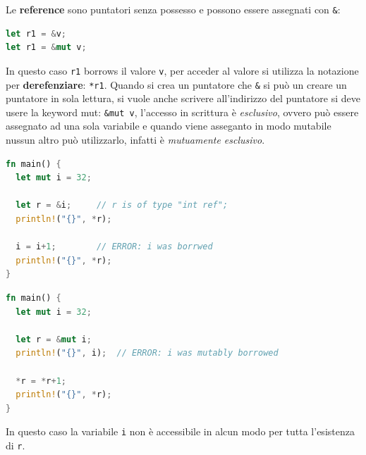\documentclass[12pt]{article}
\begin{document}
Le \textbf{reference} sono puntatori senza possesso e possono essere assegnati con \texttt{\&}:
\begin{lstlisting}[language=rust]
let r1 = &v;
let r1 = &mut v;
\end{lstlisting}
In questo caso \texttt{r1} borrows il valore \texttt{v}, per acceder al valore si utilizza la notazione per \textbf{derefenziare}: \texttt{*r1}. Quando si crea un puntatore che \texttt{\&} si pu\`o un creare un puntatore in sola lettura, si vuole anche scrivere all'indirizzo del puntatore si deve usere la keyword mut: \texttt{\&mut v}, l'accesso in scrittura \`e \emph{esclusivo}, ovvero pu\`o essere assegnato ad una sola variabile e quando viene asseganto in modo mutabile nussun altro pu\`o utilizzarlo, infatti \`e \emph{mutuamente esclusivo}.
\begin{lstlisting}[language=rust]
fn main() {
  let mut i = 32;

  let r = &i;     // r is of type "int ref";
  println!("{}", *r);

  i = i+1;        // ERROR: i was borrwed
  println!("{}", *r);
}
\end{lstlisting}
\begin{lstlisting}[language=rust]
fn main() {
  let mut i = 32;

  let r = &mut i;
  println!("{}", i);  // ERROR: i was mutably borrowed

  *r = *r+1;
  println!("{}", *r);
}
\end{lstlisting}
In questo caso la variabile \texttt{i} non \`e accessibile in alcun modo per tutta l'esistenza di \texttt{r}.
\end{document}
